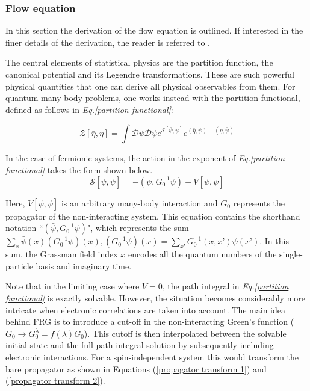 \documentclass[11pt]{article}
\begin{document}
\subsubsection{Flow equation}
\label{subsubsec:Flow Equation}

In this section the derivation of the flow equation is outlined. 
If interested in the finer details of the derivation, the reader is referred to \cite{metzner2012functional}. \par
\medskip
\noindent The central elements of statistical physics are the partition function, the canonical potential and its Legendre transformations. 
These are such powerful physical quantities that one can derive all physical observables from them.
For quantum many-body problems, one works instead with the partition functional, defined as follows in \textit{Eq.\ref{partition functional}}:

\begin{equation}\label{partition functional}
    \mathcal{Z}[\bar{\eta}, \eta] = \int \mathcal{D} \bar{\psi} \mathcal{D}\psi e^{\mathcal{S}[\bar{\psi}, \psi]}e^{(\bar{\eta}, \psi)+(\eta, \bar{\psi})}
\end{equation}

\noindent In the case of fermionic systems, the action in the exponent of \textit{Eq.\ref{partition functional}} takes the form shown below.
\begin{equation} \label{action}
    \mathcal{S}[\psi, \bar{\psi}] = -(\bar{\psi}, G_0^{-1} \psi) + V[\psi, \bar{\psi}]
\end{equation}

\noindent Here, $V[\psi, \bar{\psi}]$ is an arbitrary many-body interaction and $G_0$ represents the propagator of the non-interacting system. 
This equation contains the shorthand notation ``$(\bar{\psi}, G_0^{-1} \psi)$", which represents the sum $\sum_x \bar{\psi}(x)(G_0^{-1}\psi)(x), (G_0^{-1}\psi)(x) = \sum_{x’}G_0^{-1}(x,x’)\psi(x’)$. In this sum, the Grassman field index $x$ encodes all the quantum numbers of the single-particle basis and imaginary time.\par
\medskip

\noindent Note that in the limiting case where $V=0$, the path integral in \textit{Eq.\ref{partition functional}} is exactly solvable. 
However, the situation becomes considerably more intricate when electronic correlations are taken into account.
The main idea behind FRG is to introduce a cut-off in the non-interacting Green's function ($G_0 \rightarrow G_0^{\lambda} = f(\lambda)G_0$). 
This cutoff is then interpolated between the solvable initial state and the full path integral solution by subsequently including electronic interactions. For a spin-independent system this would transform the 
bare propagator as shown in Equations (\ref{propagator transform 1}) and (\ref{propagator transform 2}). 
\end{document}

